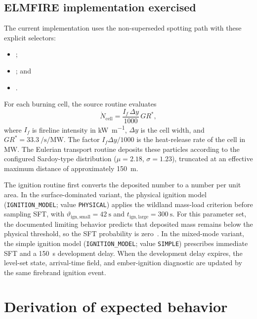 \subsection{ELMFIRE implementation exercised}

The current implementation uses the non-superseded spotting path with these
explicit selectors:
\begin{itemize}
\item {};
\item {}; and
\item {}.
\end{itemize}
For each burning cell, the source routine evaluates
\begin{equation}
 \dot N_{\mathrm{cell}}
 = \frac{I_f\,\Delta y}{1000}\,GR^* ,
 \label{eq:generation}
\end{equation}
where $I_f$ is fireline intensity in \si{\kilo\watt\per\metre},
$\Delta y$ is the cell width, and
$GR^*=\SI{33.3}{\per\second\per\mega\watt}$. The factor
$I_f\Delta y/1000$ is the heat-release rate of the cell in MW. The Eulerian
transport routine deposits these particles according to the configured
Sardoy-type distribution ($\mu=2.18$, $\sigma=1.23$), truncated at an
effective maximum distance of approximately \SI{150}{\metre}.

The ignition routine first converts the deposited number to a number per unit
area. In the surface-dominated variant, the physical ignition model
(\texttt{IGNITION\_\allowbreak MODEL}; value \texttt{PHYSICAL}) applies the
wildland mass-load criterion before sampling SFT, with
$\vartheta_{\mathrm{ign,small}}=\SI{42}{\second}$ and
$t_{\mathrm{ign,large}}=\SI{300}{\second}$. For this parameter set, the
documented limiting behavior predicts that deposited mass remains below the
physical threshold, so the SFT probability is zero~\cite{Qin2025}. In the
mixed-mode variant, the simple ignition model
(\texttt{IGNITION\_\allowbreak MODEL}; value \texttt{SIMPLE}) prescribes immediate
SFT and a \SI{150}{\second} development delay. When the development delay
expires, the level-set state, arrival-time field, and ember-ignition diagnostic
are updated by the same firebrand ignition event.

\section{Derivation of expected behavior}

